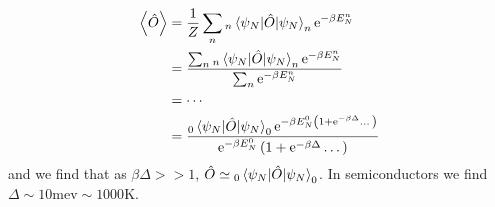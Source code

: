 \begin{align}
\expval{\hat{O}} &= \frac{1}{Z}\sum_n {}_n\expval{\hat{O}}{\psi_N}_n\mathrm{e}^{-\beta E_N^n} \nonumber\\
&= \frac{\sum_n {}_n\expval{\hat{O}}{\psi_N}_n\mathrm{e}^{-\beta E_N^n}}{\sum_n\mathrm{e}^{-\beta E_N^n}} \nonumber\\
&= \cdots \nonumber\\
&= \frac{{}_0\expval{\hat{O}}{\psi_N}_0\mathrm{e}^{-\beta E_N^0\left(1+\mathrm{e}^{-\beta\Delta}\dots\right)}}{\mathrm{e}^{-\beta E_N^0}\left(1+\mathrm{e}^{-\beta\Delta}\dots\right)} \label{unc:statmech}
\end{align}
and we find that as $\beta\Delta >> 1$, $\hat{O} \simeq {}_0\expval{\hat{O}}{\psi_N}_0$.
In semiconductors we find $\Delta \sim 10\mathrm{mev} \sim 1000\mathrm{K}$.




















